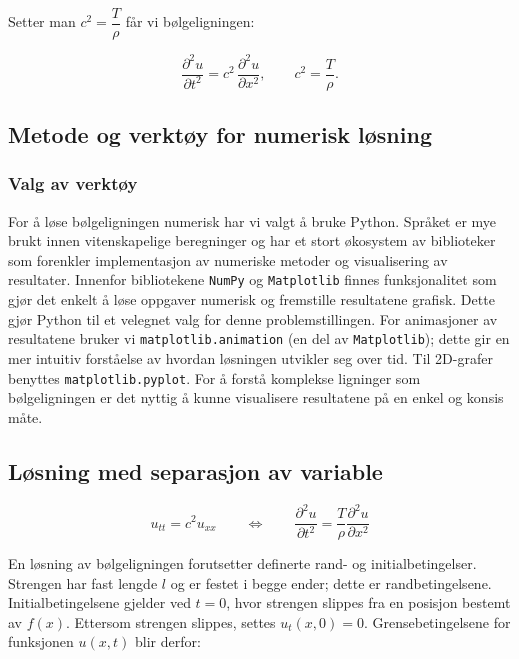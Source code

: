 Setter man $c^2=\dfrac{T}{\rho}$ får vi bølgeligningen: 

\begin{equation}
  \frac{\partial^2 u}{\partial t^2}
  = c^2\,\frac{\partial^2 u}{\partial x^2},
  \qquad
  c^2=\frac{T}{\rho}.
  \label{eq:utledetBolgelikning}
\end{equation}

\subsection{Metode og verktøy for numerisk løsning}
\subsubsection{Valg av verktøy}
For å løse bølgeligningen numerisk har vi valgt å bruke Python. Språket er mye brukt innen
vitenskapelige beregninger og har et stort økosystem av biblioteker som forenkler implementasjon av
numeriske metoder og visualisering av resultater. Innenfor bibliotekene \texttt{NumPy} og \texttt{Matplotlib}
finnes funksjonalitet som gjør det enkelt å løse oppgaver numerisk og fremstille resultatene grafisk.
Dette gjør Python til et velegnet valg for denne problemstillingen. For animasjoner av resultatene bruker
vi \texttt{matplotlib.animation} (en del av \texttt{Matplotlib}); dette gir en mer intuitiv forståelse av
hvordan løsningen utvikler seg over tid. Til 2D-grafer benyttes \texttt{matplotlib.pyplot}. For å forstå
komplekse ligninger som bølgeligningen er det nyttig å kunne visualisere resultatene på en enkel og
konsis måte.

\subsection{Løsning med separasjon av variable}
\begin{equation}
	u_{tt} = c^2 u_{xx} \qquad \iff \qquad 
	\frac{\partial^2 u}{\partial t^2} = \frac{T}{\rho} \frac{\partial^2 u}{\partial x^2}	
	\label{eq:bølgelikningForLøsning}
\end{equation}

En løsning av bølgeligningen forutsetter definerte rand- og initialbetingelser. Strengen har fast lengde $l$
og er festet i begge ender; dette er randbetingelsene. Initialbetingelsene gjelder ved $t=0$, hvor strengen
slippes fra en posisjon bestemt av $f(x)$. Ettersom strengen slippes, settes $u_t(x,0) = 0$.
\clearpage
Grensebetingelsene for funksjonen $u(x,t)$ blir derfor:

